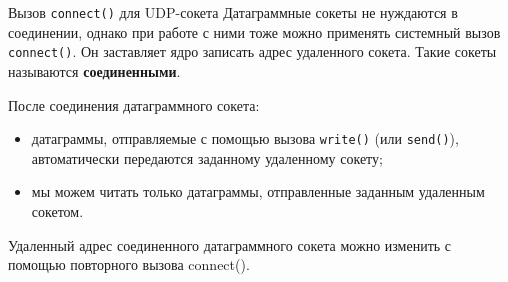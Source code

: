 \documentclass{beamer}
\begin{document}
\begin{frame}{Вызов \texttt{connect()} для UDP-сокета}
    Датаграммные сокеты не нуждаются в соединении, однако при работе с ними тоже можно применять системный вызов \texttt{connect()}. Он заставляет ядро записать адрес удаленного сокета. Такие сокеты называются \textbf{соединенными}. 
    
    После соединения датаграммного сокета:
    \begin{itemize}
        \item датаграммы, отправляемые с помощью вызова \texttt{write()} (или \texttt{send()}), автоматически передаются заданному удаленному сокету;        
        \item мы можем читать только датаграммы, отправленные заданным удаленным сокетом.
    \end{itemize}
    
    Удаленный адрес соединенного датаграммного сокета можно изменить с помощью повторного вызова connect().
\end{frame}
\end{document}
